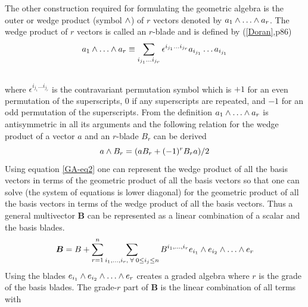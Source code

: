 \documentclass[letterpaper,10pt,english]{sphinxmanual}
\begin{document}
The other construction required for formulating the geometric algebra is the outer or wedge product (symbol $\wedge$) of $r$
vectors denoted by $a_{1}\W\dots\W a_{r}$.  The wedge product of $r$ vectors is called an $r$-blade and is defined
by ({\hyperref[GA:doran]{{[}Doran{]}}},p86)
\begin{gather}
\begin{split}\begin{equation*}
   a_{1}\W\dots\W a_{r} \equiv \sum_{i_{j_{1}}\dots i_{j_{r}}} \epsilon^{i_{j_{1}}\dots i_{j_{r}}}a_{i_{j_{1}}}\dots a_{i_{j_{1}}}
\end{equation*}\end{split}\notag\\\begin{split}\end{split}\notag
\end{gather}
where $\epsilon^{i_{j_{1}}\dots i_{j_{r}}}$ is the contravariant permutation symbol which is $+1$ for an even permutation of the
superscripts, $0$ if any superscripts are repeated, and $-1$ for an odd permutation of the superscripts. From the definition
$a_{1}\W\dots\W a_{r}$ is antisymmetric in all its arguments and the following relation for the wedge product of a vector $a$ and an
$r$-blade $B_{r}$ can be derived
\label{GA:equation-eq2}\begin{equation}
   a\wedge B_{r} = (aB_{r}+(-1)^{r}B_{r}a)/2
\end{equation}
Using equation \eqref{GA-eq2} one can represent the wedge product of all the basis vectors
in terms of the geometric product of all the basis vectors so that one can solve (the system
of equations is lower diagonal) for the geometric product of all the basis vectors in terms of
the wedge product of all the basis vectors.  Thus a general multivector $\bm{B}$ can be
represented as a linear combination of a scalar and the basis blades.
\begin{gather}
\begin{split}\begin{equation*}
   \bm{B} = B + \sum_{r=1}^{n}\sum_{i_{1},\dots,i_{r},\;\forall\; 0\le i_{j} \le n} B^{i_{1},\dots,i_{r}}e_{i_{1}}\W e_{i_{2}}\W\dots\W e_{r}
\end{equation*}\end{split}\notag
\end{gather}
Using the blades $e_{i_{1}}\W e_{i_{2}}\W\dots\W e_{r}$ creates a graded
algebra where $r$ is the grade of the basis blades.  The grade-$r$
part of $\bm{B}$ is the linear combination of all terms with
\end{document}
